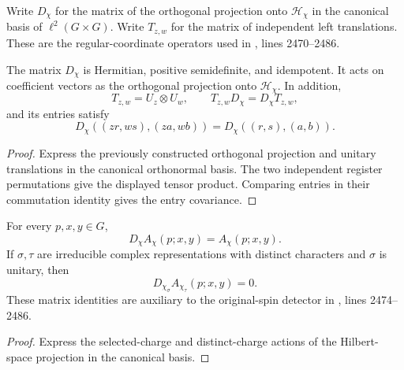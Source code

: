 \begin{definition}
    \label{def:peps_regular_charge_detector_matrix}
    \leanok
    Write $D_\chi$ for the matrix of the orthogonal projection onto
    $\mathcal H_\chi$ in the canonical basis of $\ell^2(G\times G)$.
    Write $T_{z,w}$ for the matrix of independent left translations.
    These are the regular-coordinate operators used in
    \cite[charge detection]{Schuch2010PEPS}, lines 2470--2486.
\end{definition}

\begin{lemma}
    \label{thm:peps_regular_charge_detector_matrix}
    \leanok
    The matrix $D_\chi$ is Hermitian, positive semidefinite, and idempotent.
    It acts on coefficient vectors as the orthogonal projection onto
    $\mathcal H_\chi$. In addition,
    \[
        T_{z,w}=U_z\otimes U_w,\qquad
        T_{z,w}D_\chi=D_\chi T_{z,w},
    \]
    and its entries satisfy
    \[
        D_\chi((zr,ws),(za,wb))=D_\chi((r,s),(a,b)).
    \]
\end{lemma}
\begin{proof}\leanok
    Express the previously constructed orthogonal projection and unitary
    translations in the canonical orthonormal basis. The two independent
    register permutations give the displayed tensor product. Comparing
    entries in their commutation identity gives the entry covariance.
\end{proof}

\begin{lemma}
    \label{thm:peps_regular_charge_detector_matrix_eigenvectors}
    \leanok
    For every $p,x,y\in G$,
    \[
        D_\chi A_\chi(p;x,y)=A_\chi(p;x,y).
    \]
    If $\sigma,\tau$ are irreducible complex representations with distinct
    characters and $\sigma$ is unitary, then
    \[
        D_{\chi_\sigma}A_{\chi_\tau}(p;x,y)=0.
    \]
    These matrix identities are auxiliary to the original-spin detector in
    \cite[charge detection]{Schuch2010PEPS}, lines 2474--2486.
\end{lemma}
\begin{proof}\leanok
    Express the selected-charge and distinct-charge actions of the Hilbert-space
    projection in the canonical basis.
\end{proof}
